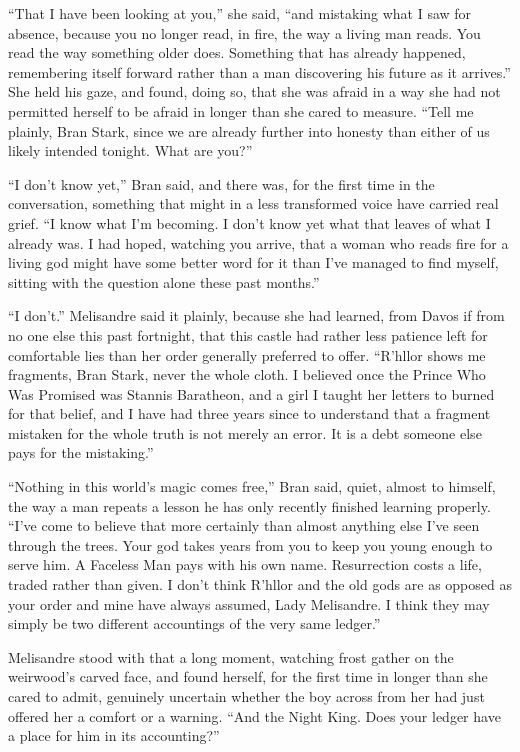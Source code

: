 “That I have been looking at you,” she said, “and mistaking what I saw for absence, because you no longer read, in fire, the way a living man reads. You read the way something older does. Something that has already happened, remembering itself forward rather than a man discovering his future as it arrives.” She held his gaze, and found, doing so, that she was afraid in a way she had not permitted herself to be afraid in longer than she cared to measure. “Tell me plainly, Bran Stark, since we are already further into honesty than either of us likely intended tonight. What are you?”

“I don’t know yet,” Bran said, and there was, for the first time in the conversation, something that might in a less transformed voice have carried real grief. “I know what I’m becoming. I don’t know yet what that leaves of what I already was. I had hoped, watching you arrive, that a woman who reads fire for a living god might have some better word for it than I’ve managed to find myself, sitting with the question alone these past months.”

“I don’t.” Melisandre said it plainly, because she had learned, from Davos if from no one else this past fortnight, that this castle had rather less patience left for comfortable lies than her order generally preferred to offer. “R’hllor shows me fragments, Bran Stark, never the whole cloth. I believed once the Prince Who Was Promised was Stannis Baratheon, and a girl I taught her letters to burned for that belief, and I have had three years since to understand that a fragment mistaken for the whole truth is not merely an error. It is a debt someone else pays for the mistaking.”

“Nothing in this world’s magic comes free,” Bran said, quiet, almost to himself, the way a man repeats a lesson he has only recently finished learning properly. “I’ve come to believe that more certainly than almost anything else I’ve seen through the trees. Your god takes years from you to keep you young enough to serve him. A Faceless Man pays with his own name. Resurrection costs a life, traded rather than given. I don’t think R’hllor and the old gods are as opposed as your order and mine have always assumed, Lady Melisandre. I think they may simply be two different accountings of the very same ledger.”

Melisandre stood with that a long moment, watching frost gather on the weirwood’s carved face, and found herself, for the first time in longer than she cared to admit, genuinely uncertain whether the boy across from her had just offered her a comfort or a warning. “And the Night King. Does your ledger have a place for him in its accounting?”

